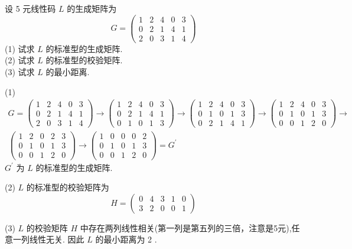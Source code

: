 \begin{exercise}
设 5 元线性码 $ L $ 的生成矩阵为
$$
G=\left(\begin{array}{lllll}
1 & 2 & 4 & 0 & 3 \\
0 & 2 & 1 & 4 & 1 \\
2 & 0 & 3 & 1 & 4
\end{array}\right)
$$
(1) 试求 $ L $ 的标准型的生成矩阵.\\
(2) 试求 $ L $ 的标准型的校验矩阵.\\
(3) 试求 $ L $ 的最小距离.
\end{exercise}
\begin{solution}
(1)
$$
\begin{array}{l}
 G=\left(\begin{array}{lllll}
1 & 2 & 4 & 0 & 3 \\
0 & 2 & 1 & 4 & 1 \\
2 & 0 & 3 & 1 & 4
\end{array}\right) \rightarrow\left(\begin{array}{lllll}
1 & 2 & 4 & 0 & 3 \\
0 & 2 & 1 & 4 & 1 \\
0 & 1 & 0 & 1 & 3
\end{array}\right) \rightarrow 
\left(\begin{array}{lllll}
1 & 2 & 4 & 0 & 3 \\
0 & 1 & 0 & 1 & 3 \\
0 & 2 & 1 & 4 & 1
\end{array}\right) \rightarrow\left(\begin{array}{lllll}
1 & 2 & 4 & 0 & 3 \\
0 & 1 & 0 & 1 & 3 \\
0 & 0 & 1 & 2 & 0
\end{array}\right) \rightarrow \\
\left(\begin{array}{lllll}
1 & 2 & 0 & 2 & 3 \\
0 & 1 & 0 & 1 & 3 \\
0 & 0 & 1 & 2 & 0
\end{array}\right) \rightarrow\left(\begin{array}{lllll}
1 & 0 & 0 & 0 & 2 \\
0 & 1 & 0 & 1 & 3 \\
0 & 0 & 1 & 2 & 0
\end{array}\right)=G^{\prime}
\end{array}
$$
$ G^{\prime} $ 为 $ L $ 的标准型的生成矩阵.

(2) $ L $ 的标准型的校验矩阵为
$$
H=\left(\begin{array}{lllll}
0 & 4 & 3 & 1 & 0 \\
3 & 2 & 0 & 0 & 1
\end{array}\right)
$$

(3) $ L $ 的校验矩阵 $ H $ 中存在两列线性相关(第一列是第五列的三倍，注意是5元),任意一列线性无关. 因此 $ L $ 的最小距离为 2 .
\end{solution}


